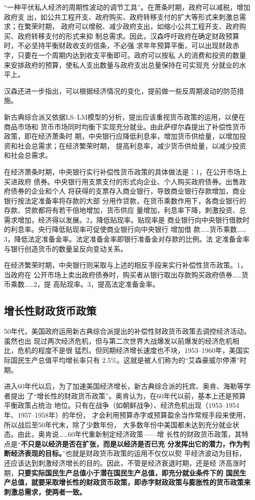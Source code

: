 “一种平伏私人经济的周期性波动的调节工具”。在萧条时期，政府可以减税，增加政府支
出，如公共工程开支、政府购买、政府转移支付的扩大等形式来刺激总需求；在繁荣时期，
政府可以增税、减少政府支出，如缩小公共工程开支、政府购买、政府转移支付的形式来抑
制总需求。因此，汉森呼吁政府在确定财政预算时，不必坚持平衡财政收支的信条，不必强
求年年预算平衡，可以出现财政赤字，只要在一个周期内达到收支平衡即可。政府可以按私
人的消费和投资的数量来安排政府的预算，使私人支出数量与政府支出总量保持在可实现充
分就业的水平上。

汉森还进一步指出，可以根据经济情况的变化，提前做一些反周期波动的防范措施。

新古典综合派又依据LS--LM模型的分析，提出应该重视货币政策的运用，以便在商品市场和
货币市场同时均衡下实现充分就业。由此萨缪尔森提出了补偿性货币政策，即在经济萧条时
期，中央银行应降低利息率，增加货币供给量，以增加投资和社会总需求；在经济繁荣时期，
提高利息率，减少货币供给量，以减少投资和社会总需求。

在经济萧条时期，中央银行实行补偿性货币政策的具体做法是：1，在公开市场上买进政府
债券。中央银行用支票支付的形式向企业、个人购买政府债券。出售政府债券的企业和个人
将获得的支票存入商业银行，导致商业银行存款增加，商业银行按法定准备率将存款的大部
分用作贷款，在货币乘数作用下，各商业银行的存款、贷款都将有若干倍地增加，货币供应
量增加，利息率下降，刺激投资、总需求增加，经济得以发展。2，降低贴现率。贴现率是
商业银行向中央银行借款时的利息率。央行降低贴现率可促使商业银行向中央银行 增加借
款……货币乘数……3，降低法定准备金率。法定准备金率即银行准备金对存款的比例。法
定准备金率与银行创造货币的数量呈反向变动关系。

在经济繁荣时期，中央银行则采取与上述的相反手段来实行补偿性货币政策。1，当政府在
公开市场上卖出政府债券时，购买者从银行取出存款购买政府债券……货币乘数……2，提
高贴现率。3，提高法定准备金率。

\subsection{增长性财政货币政策}

50年代，美国政府运用新古典综合派提出的补偿性财政货币政策去调控经济活动。虽然也出
现过两次经济危机，但与第二次世界大战爆发以前爆发的经济危机相比，危机的程度不是很
猛烈。但同期经济增长速度也不块，1953--1960年，美国实际国民生产总值平均增长率只有
2.5\%。这就是被人们称为的“艾森豪威尔停滞”时期。

进入60年代以后，为了加速美国经济增长，新古典综合派的托宾、奥肯、海勒等学者提出
了“增长性的财政货币政策”。奥肯认为，在60年代以前，基本上还是预算平衡政策占统治
地位。只有在战争（如朝鲜战争）、经济危机出现（1953--1954年、1957--1958年）的年份，
才会利用预算赤字或预算盈余当作常规手段来使用，所以战后至50年代末，除了少数年份，
大多数年份中美国都未达到充分就业状态。由此，奥肯说……60年代重新制定经济政策——增
长性的财政货币政策，其特点是“\textbf{不只是以经济是否在扩张，而是以经济是否已充
  分发挥出它的潜力，作为判断经济表现的目标。}”也就是财政货币政策的运用不仅仅以熨
平经济波动为目标，还应该达到刺激经济增长的目的。因此，不管是经济衰退时期，还是经
济高涨时期，\textbf{只要实际国民生产总值小于潜在国民生产总值，即充分就业条件下的
  国民生产总值，就要采取增长性的财政货币政策，即赤字财政政策与膨胀性的货币政策来
  刺激总需求，使两者一致。}

